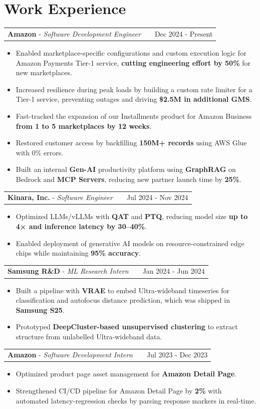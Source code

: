 \documentclass[a4paper,9pt]{article}
\makeatletter
\newenvironment{joblong}[3]
    {
    \begin{tabularx}{\linewidth}{@{}l X r@{}}
    \textbf{#1} - \textit{#2} & & #3 \\[3.75pt]
    \end{tabularx}
    \begin{minipage}[t]{\linewidth}
    \begin{itemize}[nosep, leftmargin=1em, itemsep=1pt, label=\textbullet]
    }
    {
    \end{itemize}
    \end{minipage}
    }
\makeatother
\begin{document}
\section{Work Experience}

\begin{joblong}{Amazon}{Software Development Engineer}{Dec 2024 - Present}
\item Enabled marketplace-specific configurations and custom execution logic for Amazon Payments Tier-1 service, \textbf{cutting engineering effort by 50\%} for new marketplaces.
\item Increased resilience during peak loads by building a custom rate limiter for a Tier-1 service, preventing outages and driving \textbf{\$2.5M in additional GMS}.
\item Fast-tracked the expansion of our Installments product for Amazon Business \textbf{from 1 to 5 marketplaces by 12 weeks}.
\item Restored customer access by backfilling \textbf{150M+ records} using AWS Glue with 0\% errors.
\item Built an internal \textbf{Gen-AI} productivity platform using \textbf{GraphRAG} on Bedrock and \textbf{MCP Servers}, reducing new partner launch time by \textbf{25\%}.
\end{joblong}

\begin{joblong}{Kinara, Inc.}{Software Engineer}{Jul 2024 - Nov 2024}
\item Optimized LLMs/vLLMs with \textbf{QAT} and \textbf{PTQ}, reducing model size \textbf{up to 4× and inference latency by 30–40\%}. 
\item Enabled deployment of generative AI models on resource-constrained edge chips while maintaining \textbf{95\% accuracy}.
\end{joblong}

\begin{joblong}{Samsung R\&D}{ML Research Intern}{Jan 2024 - Jun 2024}
\item Built a pipeline with \textbf{VRAE} to embed Ultra-wideband timeseries for classification and autofocus distance prediction, which was shipped in \textbf{Samsung S25}.
\item Prototyped \textbf{DeepCluster-based unsupervised clustering} to extract structure from unlabelled Ultra-wideband data.
\end{joblong}

\begin{joblong}{Amazon}{Software Development Intern}{Jul 2023 - Dec 2023}
\item Optimized product page asset management for \textbf{Amazon Detail Page}.
\item Strengthened CI/CD pipeline for Amazon Detail Page by \textbf{2\%} with automated latency-regression checks by parsing response markers in real-time.
\end{joblong}
\end{document}
